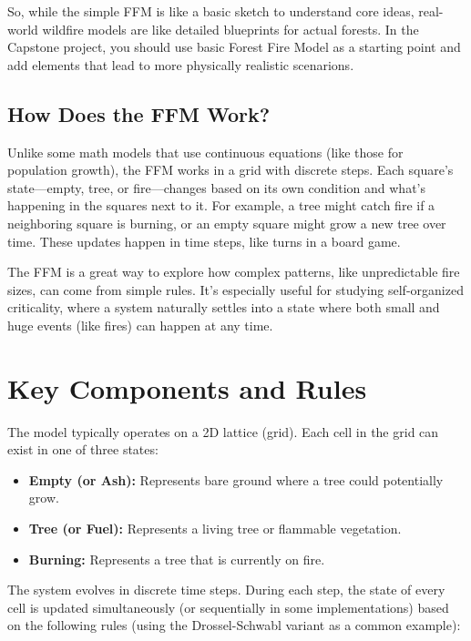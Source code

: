 \documentclass{article}
\begin{document}
So, while the simple FFM is like a basic sketch to understand core ideas, real-world wildfire models are like detailed blueprints for actual forests. In the Capstone project, you should use basic Forest Fire Model as a starting point and add elements that lead to more physically realistic scenarions.

\subsection{How Does the FFM Work?}

Unlike some math models that use continuous equations (like those for population growth), the FFM works in a grid with discrete steps. Each square’s state---empty, tree, or fire---changes based on its own condition and what’s happening in the squares next to it. For example, a tree might catch fire if a neighboring square is burning, or an empty square might grow a new tree over time. These updates happen in time steps, like turns in a board game.

The FFM is a great way to explore how complex patterns, like unpredictable fire sizes, can come from simple rules. It’s especially useful for studying self-organized criticality, where a system naturally settles into a state where both small and huge events (like fires) can happen at any time.

\section{Key Components and Rules}

The model typically operates on a 2D lattice (grid). Each cell in the grid can exist in one of three states:
\begin{itemize}
    \item \textbf{Empty (or Ash):} Represents bare ground where a tree could potentially grow.
    \item \textbf{Tree (or Fuel):} Represents a living tree or flammable vegetation.
    \item \textbf{Burning:} Represents a tree that is currently on fire.
\end{itemize}

The system evolves in discrete time steps. During each step, the state of every cell is updated simultaneously (or sequentially in some implementations) based on the following rules (using the Drossel-Schwabl variant as a common example):
\end{document}
